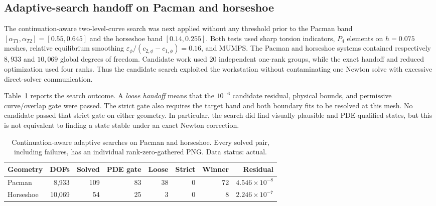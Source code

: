 \subsection{Adaptive-search handoff on Pacman and horseshoe}
\label{sec:adaptive-pacman-horseshoe}

The continuation-aware two-level-curve search was next applied without any
threshold prior to the Pacman band
$[\alpha_{T1},\alpha_{T2}]=[0.55,0.645]$ and the horseshoe band
$[0.14,0.255]$.  Both tests used sharp torsion indicators, $P_4$ elements on
$h=0.075$ meshes, relative equilibrium smoothing
$\varepsilon_\phi/(c_{2,\phi}-c_{1,\phi})=0.16$, and MUMPS.  The Pacman and
horseshoe systems contained respectively $8{,}933$ and $10{,}069$ global
degrees of freedom.  Candidate work used 20 independent one-rank groups,
while the exact handoff and reduced optimization used four ranks.  Thus the
candidate search exploited the workstation without contaminating one Newton
solve with excessive direct-solver communication.

Table~\ref{tab:adaptive-pacman-horseshoe} reports the search outcome.  A
\emph{loose handoff} means that the $10^{-6}$ candidate residual, physical
bounds, and permissive curve/overlap gate were passed.  The strict gate also
requires the target band and both boundary fits to be resolved at this mesh.
No candidate passed that strict gate on either geometry.  In particular, the
search did find visually plausible and PDE-qualified states, but this is not
equivalent to finding a state stable under an exact Newton correction.

\begin{table}[tbp]
\centering
\caption{Continuation-aware adaptive searches on Pacman and horseshoe.  Every
solved pair, including failures, has an individual rank-zero-gathered PNG.
Data status: actual.}
\label{tab:adaptive-pacman-horseshoe}
\begin{tabular}{lrrrrrrr}
\toprule
Geometry & DOFs & Solved & PDE gate & Loose & Strict & Winner & Residual \\
\midrule
Pacman & 8,933 & 109 & 83 & 38 & 0 & 72 & $4.546\times10^{-8}$ \\
Horseshoe & 10,069 & 54 & 25 & 3 & 0 & 8 & $2.246\times10^{-7}$ \\
\bottomrule
\end{tabular}
\end{table}

